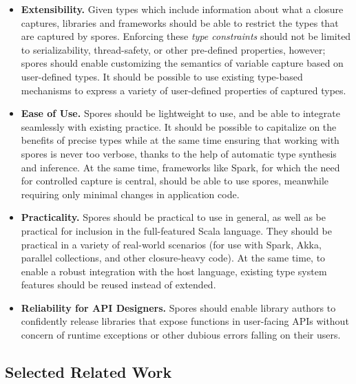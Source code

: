 \documentclass[runningheads]{llncs}
\begin{document}
\begin{sloppypar}
\begin{itemize}
\item {\bf Extensibility.} Given types which include information about what  a
closure captures, libraries and frameworks should be able to restrict the
types that are captured by spores. Enforcing these {\em type constraints}
should not be limited to serializability, thread-safety, or other pre-defined
properties, however; spores should enable customizing the semantics of
variable capture based on user-defined types. It should be possible to use
existing type-based mechanisms to express a variety of user-defined properties
of captured types.

\item {\bf Ease of Use.} Spores should be lightweight
to use, and be able to integrate seamlessly with existing practice. It should
be possible to capitalize on the benefits of precise types while at the same
time ensuring that working with spores is never too verbose, thanks
to the help of automatic type synthesis and inference. At the same time,
frameworks like Spark, for which the need for controlled capture is central,
should be able to use spores, meanwhile requiring only minimal changes in
application code.

\item {\bf Practicality.} Spores should be practical to use in general, as
well as be practical for inclusion in the full-featured Scala language. They
should be practical in a variety of real-world scenarios (for use with Spark,
Akka, parallel collections, and other closure-heavy code). At the same time,
to enable a robust integration with the host language, existing type system
features should be reused instead of extended.

\item {\bf Reliability for API Designers.} Spores should enable library
authors to confidently release libraries that expose functions in user-facing
APIs without concern of runtime exceptions or other dubious errors falling on
their users.

\end{itemize}

\subsection{Selected Related Work}\label{sec:sel-rel-work}


\end{sloppypar}
\end{document}
